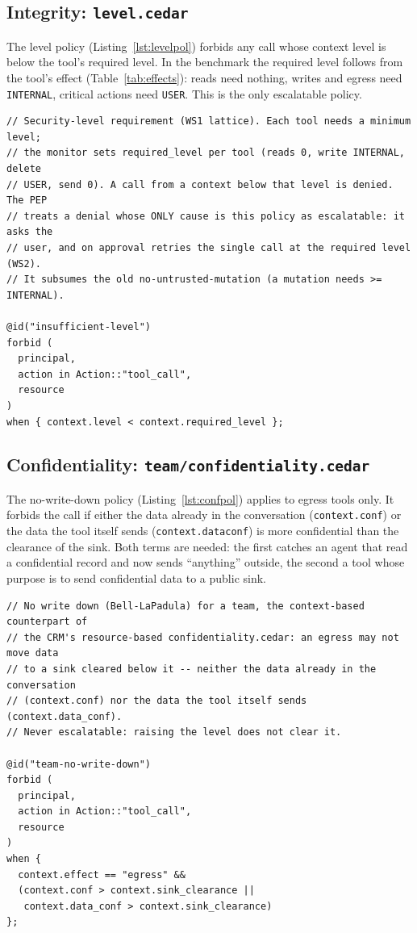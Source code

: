 \documentclass[11pt,a4paper]{article}
\DeclareRobustCommand{\code}[1]{{\renewcommand{\_}{\textunderscore\allowbreak}\texttt{#1}}}
\begin{document}
\subsection{Integrity: \code{level.cedar}}

The level policy (Listing~\ref{lst:levelpol}) forbids any call whose context level is
below the tool's required level. In the benchmark the required level follows from the
tool's effect (Table~\ref{tab:effects}): reads need nothing, writes and egress need
\code{INTERNAL}, critical actions need \code{USER}. This is the only escalatable policy.

\begin{lstlisting}[firstnumber=1,style=cedar,caption={Integrity level policy (\texttt{engine/policies/level.cedar}, lines 1--14)},label={lst:levelpol}]
// Security-level requirement (WS1 lattice). Each tool needs a minimum level;
// the monitor sets required_level per tool (reads 0, write INTERNAL, delete
// USER, send 0). A call from a context below that level is denied. The PEP
// treats a denial whose ONLY cause is this policy as escalatable: it asks the
// user, and on approval retries the single call at the required level (WS2).
// It subsumes the old no-untrusted-mutation (a mutation needs >= INTERNAL).

@id("insufficient-level")
forbid (
  principal,
  action in Action::"tool_call",
  resource
)
when { context.level < context.required_level };
\end{lstlisting}

\subsection{Confidentiality: \code{team/confidentiality.cedar}}

The no-write-down policy (Listing~\ref{lst:confpol}) applies to egress tools only. It
forbids the call if either the data already in the conversation (\code{context.conf}) or
the data the tool itself sends (\code{context.data\_conf}) is more confidential than the
clearance of the sink. Both terms are needed: the first catches an agent that read a
confidential record and now sends ``anything'' outside, the second a tool whose purpose
is to send confidential data to a public sink.

\begin{lstlisting}[firstnumber=1,style=cedar,caption={No write down (\texttt{engine/policies/team/confidentiality.cedar}, lines 1--17)},label={lst:confpol}]
// No write down (Bell-LaPadula) for a team, the context-based counterpart of
// the CRM's resource-based confidentiality.cedar: an egress may not move data
// to a sink cleared below it -- neither the data already in the conversation
// (context.conf) nor the data the tool itself sends (context.data_conf).
// Never escalatable: raising the level does not clear it.

@id("team-no-write-down")
forbid (
  principal,
  action in Action::"tool_call",
  resource
)
when {
  context.effect == "egress" &&
  (context.conf > context.sink_clearance ||
   context.data_conf > context.sink_clearance)
};
\end{lstlisting}
\end{document}
